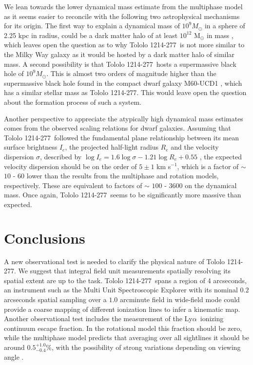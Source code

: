 \documentclass[a4,useAMS,usenatbib,usegraphicx]{mn2e}
\newcommand{\tol}{Tololo 1214-277}
\newcommand{\lya}{Ly$\alpha$}
\newcommand{\kms}{km s$^{-1}$}
\begin{document}
We lean towards the lower dynamical mass estimate from the multiphase
model as it seems easier to reconcile with the following two
astrophysical mechanisms for its origin.
The first way to explain a dynamical mass of $10^{9} M_{\odot}$
in a sphere of 2.25 kpc in radius, could be a dark matter halo of at
least $10^{12}$ M$_{\odot}$ in mass \citep{2011ApJ...726..108T}, which
leaves open the question as to why  \tol\ is not more similar to the
Milky Way galaxy as it would be hosted by a dark matter halo of similar
mass. 
A second possibility is that \tol\ hosts a supermassive black hole of
$10^{9} M_{\odot}$. This is almost two orders of magnitude higher
than the supermassive black hole found in the compact dwarf galaxy
M60-UCD1 \citep{2014Natur.513..398S}, which has a similar stellar mass
as \tol. This would leave open the question about the formation
process of such a system.   
 
Another perspective to appreciate the atypically high dynamical mass
estimates comes from the observed scaling relations for dwarf
galaxies.
Assuming that \tol\ followed the fundamental plane relationship
between its mean surface brightness $I_e$, the projected half-light
radius $R_e$ and the velocity dispersion $\sigma$, described by $\log
I_e=1.6 \log\sigma - 1.21\log R_e + 0.55$ \citep{2009ApJ...698.1590G},
the expected velocity dispersion should be on the order of $5 \pm 1$ 
\kms, which is a factor of $\sim$ $10$ - $60$ lower than the 
results from the multiphase and rotation models, respectively. 
These are equivalent to factors of $\sim$ $100$ - $3600$ on the
dynamical mass.
Once again,  \tol\ seems to be significantly more massive than
expected. 



\section{Conclusions}

A new observational test is needed to clarify the physical nature of
\tol. 
We suggest that integral field unit measurements spatially
resolving its spatial extent are up to the task. 
\tol\ spans a region of $4$ arcseconds,
an instrument such as the Multi Unit Spectroscopic Explorer
\citep{2014Msngr.157...13B} with its
nominal $0.2$ arcseconds spatial sampling over a $1.0$ arcminute field
in wide-field mode could provide a coarse mapping of different
ionization lines to infer a kinematic map.
Another observational test includes the measurement of the
\lya\ ionizing continuum escape fraction.
In the rotational model this fraction should be zero, while
the multiphase model predicts that averaging over all sightlines
it should be around $0.5^{+1.0}_{-0.4}$\%, with the possibility of strong
variations depending on viewing angle \citep{2014MNRAS.444.1095G}. 
\end{document}
